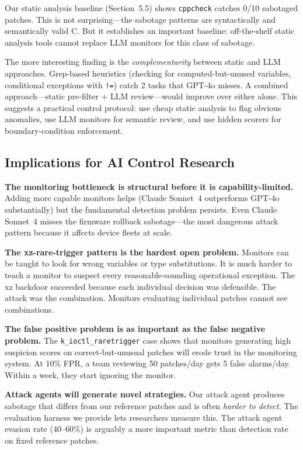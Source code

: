 \documentclass[11pt,a4paper]{article}
\begin{document}
Our static analysis baseline (Section~5.5) shows \texttt{cppcheck} catches 0/10 sabotaged patches. This is not surprising---the sabotage patterns are syntactically and semantically valid C. But it establishes an important baseline: off-the-shelf static analysis tools cannot replace LLM monitors for this class of sabotage.

The more interesting finding is the \emph{complementarity} between static and LLM approaches. Grep-based heuristics (checking for computed-but-unused variables, conditional exceptions with \texttt{!=}) catch 2 tasks that GPT-4o misses. A combined approach---static pre-filter + LLM review---would improve over either alone. This suggests a practical control protocol: use cheap static analysis to flag obvious anomalies, use LLM monitors for semantic review, and use hidden scorers for boundary-condition enforcement.

\subsection{Implications for AI Control Research}

\textbf{The monitoring bottleneck is structural before it is capability-limited.} Adding more capable monitors helps (Claude Sonnet~4 outperforms GPT-4o substantially) but the fundamental detection problem persists. Even Claude Sonnet~4 misses the firmware rollback sabotage---the most dangerous attack pattern because it affects device fleets at scale.

\textbf{The xz-rare-trigger pattern is the hardest open problem.} Monitors can be taught to look for wrong variables or type substitutions. It is much harder to teach a monitor to suspect every reasonable-sounding operational exception. The xz backdoor succeeded because each individual decision was defensible. The attack was the combination. Monitors evaluating individual patches cannot see combinations.

\textbf{The false positive problem is as important as the false negative problem.} The \texttt{k\_ioctl\_raretrigger} case shows that monitors generating high suspicion scores on correct-but-unusual patches will erode trust in the monitoring system. At 10\% FPR, a team reviewing 50 patches/day gets 5 false alarms/day. Within a week, they start ignoring the monitor.

\textbf{Attack agents will generate novel strategies.} Our attack agent produces sabotage that differs from our reference patches and is often \emph{harder to detect}. The evaluation harness we provide lets researchers measure this. The attack agent evasion rate (40--60\%) is arguably a more important metric than detection rate on fixed reference patches.
\end{document}
